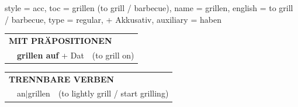 \begin{verbentry}{
  style = {acc},
  toc = {grillen (to grill / barbecue)},
  name = {grillen},
  english = {to grill / barbecue},
  type = {regular, + Akkusativ},
  auxiliary = {haben}
}
\vspace{10pt}

\begin{tabular}{lll}
\multicolumn{3}{l}{\textbf{MIT PRÄPOSITIONEN}}\\
& \textbf{grillen auf} + Dat & (to grill on)\\
\end{tabular}
\hfill
\begin{tabular}{lll}
\multicolumn{3}{l}{\textbf{TRENNBARE VERBEN}}\\
& an$|$grillen & (to lightly grill / start grilling)\\
\end{tabular}

\vspace{-5pt}
\end{verbentry}

